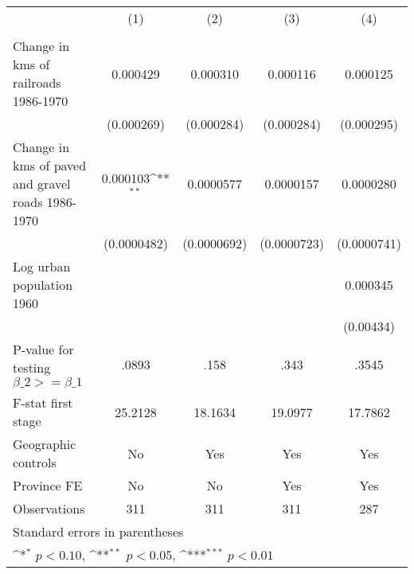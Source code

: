 {
\def\sym#1{\ifmmode^{#1}\else\(^{#1}\)\fi}
\begin{tabular}{l*{4}{c}}
\hline\hline
                &\multicolumn{1}{c}{(1)}&\multicolumn{1}{c}{(2)}&\multicolumn{1}{c}{(3)}&\multicolumn{1}{c}{(4)}\\
                &\multicolumn{1}{c}{}&\multicolumn{1}{c}{}&\multicolumn{1}{c}{}&\multicolumn{1}{c}{}\\
\hline
Change in kms of railroads 1986-1970& 0.000429         & 0.000310         & 0.000116         & 0.000125         \\
                &(0.000269)         &(0.000284)         &(0.000284)         &(0.000295)         \\
[1em]
Change in kms of paved and gravel roads 1986-1970& 0.000103\sym{**} &0.0000577         &0.0000157         &0.0000280         \\
                &(0.0000482)         &(0.0000692)         &(0.0000723)         &(0.0000741)         \\
[1em]
Log urban population 1960&                  &                  &                  & 0.000345         \\
                &                  &                  &                  &(0.00434)         \\
\hline
P-value for testing $\beta\_{2} >= \beta\_{1}$&    .0893         &     .158         &     .343         &    .3545         \\
F-stat first stage&  25.2128         &  18.1634         &  19.0977         &  17.7862         \\
Geographic controls&       No         &      Yes         &      Yes         &      Yes         \\
Province FE     &       No         &       No         &      Yes         &      Yes         \\
Observations    &      311         &      311         &      311         &      287         \\
\hline\hline
\multicolumn{5}{l}{\footnotesize Standard errors in parentheses}\\
\multicolumn{5}{l}{\footnotesize \sym{*} \(p<0.10\), \sym{**} \(p<0.05\), \sym{***} \(p<0.01\)}\\
\end{tabular}
}
